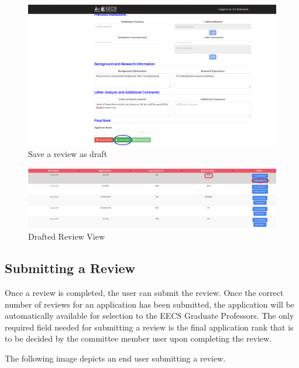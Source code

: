 \documentclass[fontsize=12pt,paper=letter,twoside]{scrartcl}
\begin{document}
\begin{figure}[!htb]
\begin{center}
\includegraphics[width=.9\textwidth]{images/save_as_draft_review.png}
\end{center}
\caption{Save a review as draft}
\label{fig:save_as_draft_review}
\end{figure}

\begin{figure}[!htb]
\begin{center}
\includegraphics[width=.9\textwidth]{images/drafted_review.png}
\end{center}
\caption{Drafted Review View}
\label{fig:drafted_review}
\end{figure}

\subsection{Submitting a Review}
Once a review is completed, the user can submit the review. Once the correct number of reviews for an application has been submitted, the application will be automatically available for selection to the EECS Graduate Professors. The only required field needed for submitting a review is the final application rank that is to be decided by the committee member user upon completing the review.

\bigskip
\noindent The following image depicts an end user submitting a review. 
\end{document}
